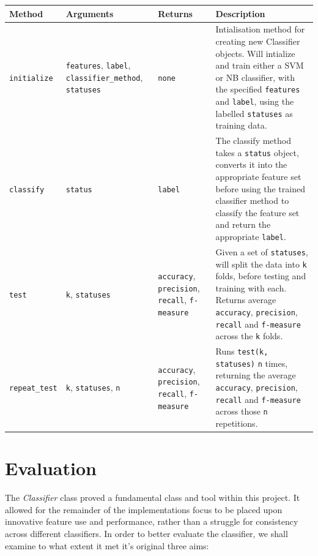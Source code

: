 \begin{centering}
	\begin{longtable}{| l | p{} | p{} | p{} |}
		\hline
		Method & Arguments & Returns & Description \\
		\hline
		\texttt{initialize} & \texttt{features}, \texttt{label}, \texttt{classifier\_method}, \texttt{statuses} & \texttt{none} & Intialisation method for creating new Classifier objects. Will intialize and train either a SVM or NB classifier, with the specified \texttt{features} and \texttt{label}, using the labelled \texttt{statuses} as training data. \\
		\hline
		\texttt{classify} & \texttt{status} & \texttt{label} & The classify method takes a \texttt{status} object, converts it into the appropriate feature set before using the trained classifier method to classify the feature set and return the appropriate \texttt{label}. \\
		\hline
		\texttt{test} & \texttt{k}, \texttt{statuses} & \texttt{accuracy}, \texttt{precision}, \texttt{recall}, \texttt{f-measure} & Given a set of \texttt{statuses}, will split the data into \texttt{k} folds, before testing and training with each. Returns average \texttt{accuracy}, \texttt{precision}, \texttt{recall} and \texttt{f-measure} across the \texttt{k} folds. \\
		\hline
		\texttt{repeat\_test} & \texttt{k}, \texttt{statuses}, \texttt{n} & \texttt{accuracy}, \texttt{precision}, \texttt{recall}, \texttt{f-measure} & Runs \texttt{test(k, statuses)} \texttt{n} times, returning the average \texttt{accuracy}, \texttt{precision}, \texttt{recall} and \texttt{f-measure} across those \texttt{n} repetitions. \\
		\hline
	\end{longtable}
\end{centering}

\section{Evaluation}

The \emph{Classifier} class proved a fundamental class and tool within this project. It allowed for the remainder of the implementations focus to be placed upon innovative feature use and performance, rather than a struggle for consistency across different classifiers. In order to better evaluate the classifier, we shall examine to what extent it met it's original three aims:

